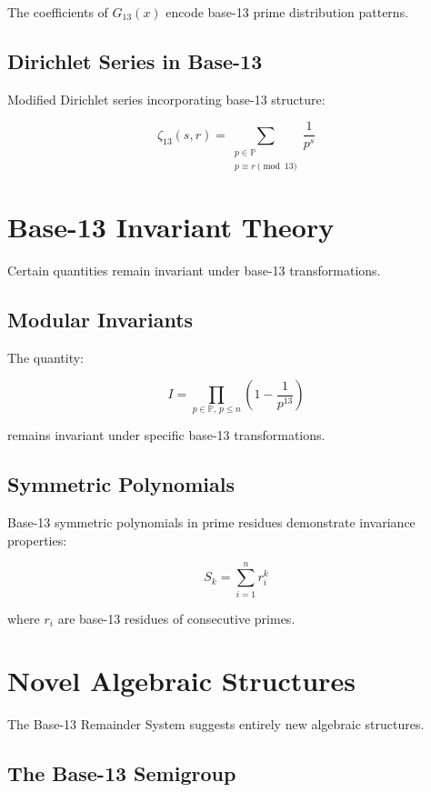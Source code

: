 \documentclass[12pt,a4paper]{report}
\newcommand{\primeSet}{\mathbb{P}}
\begin{document}
The coefficients of $G_{13}(x)$ encode base-13 prime distribution patterns.

\subsection{Dirichlet Series in Base-13}

Modified Dirichlet series incorporating base-13 structure:

\[
\zeta_{13}(s, r) = \sum_{\substack{p \in \primeSet \\ p \equiv r \pmod{13}}} \frac{1}{p^s}
\]

\section{Base-13 Invariant Theory}

Certain quantities remain invariant under base-13 transformations.

\subsection{Modular Invariants}

The quantity:

\[
I = \prod_{p \in \primeSet, \, p \leq n} \left(1 - \frac{1}{p^{13}}\right)
\]

remains invariant under specific base-13 transformations.

\subsection{Symmetric Polynomials}

Base-13 symmetric polynomials in prime residues demonstrate invariance properties:

\[
S_k = \sum_{i=1}^{n} r_i^k
\]

where $r_i$ are base-13 residues of consecutive primes.

\section{Novel Algebraic Structures}

The Base-13 Remainder System suggests entirely new algebraic structures.

\subsection{The Base-13 Semigroup}
\end{document}
